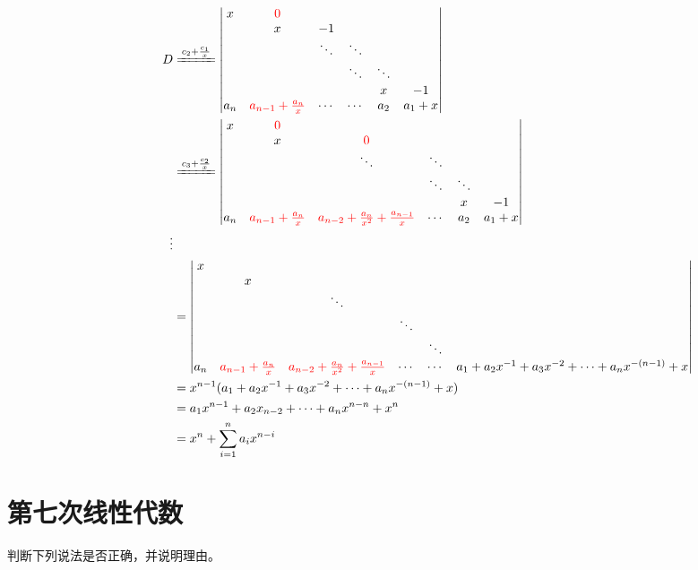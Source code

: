 \documentclass[a4paper]{report}
\begin{document}
\begin{jie}
\begin{align*}
D&\xlongequal{c_2+\frac{c_1}{x}}
\begin{vmatrix}
x&\textcolor[rgb]{1.00,0.00,0.00}{0}\\
&x&-1\\
&&\ddots&\ddots\\
&&&\ddots&\ddots\\
&&&&x&-1\\
a_{n}&\textcolor[rgb]{1.00,0.00,0.00}{a_{n-1}+\frac{a_n}{x}}&\cdots&\cdots&a_2&a_1+x
\end{vmatrix}\\ &\xlongequal{c_3+\frac{c_2}{x}}
\begin{vmatrix}
x&\textcolor[rgb]{1.00,0.00,0.00}{0}\\
&x&\textcolor[rgb]{1.00,0.00,0.00}{0}\\
&&\ddots&\ddots\\
&&&\ddots&\ddots\\
&&&&x&-1\\
a_{n}&\textcolor[rgb]{1.00,0.00,0.00}{a_{n-1}+\frac{a_n}{x}}&\textcolor[rgb]{1.00,0.00,0.00}{a_{n-2}+\frac{a_n}{x^2}+\frac{a_{n-1}}{x}}&\cdots&a_2&a_1+x
\end{vmatrix}
\\
\hphantom{~~~~~~~~~~~~~~~~~~}\vdots
\\
&=\begin{vmatrix}
x\\
&x\\
&&\ddots\\
&&&\ddots\\
&&&&\ddots&\\
a_{n}&\textcolor[rgb]{1.00,0.00,0.00}{a_{n-1}+\frac{a_n}{x}}&\textcolor[rgb]{1.00,0.00,0.00}{a_{n-2}+\frac{a_n}{x^2}+\frac{a_{n-1}}{x}}&\cdots&\cdots&a_1+a_2x^{-1}+a_{3}x^{-2}+\cdots+a_nx^{-(n-1)}+x
\end{vmatrix}
\\
&=x^{n-1}(a_1+a_2x^{-1}+a_{3}x^{-2}+\cdots+a_nx^{-(n-1)}+x)\\
&=a_1x^{n-1}+a_2x_{n-2}+\cdots+a_nx^{n-n}+x^{n}\\
&=x^{n}+\sum_{i=1}^{n}a_ix^{n-i}
\end{align*}
\end{jie}
\clearpage
\section{第七次线性代数}
\EX 判断下列说法是否正确，并说明理由。
\end{document}

